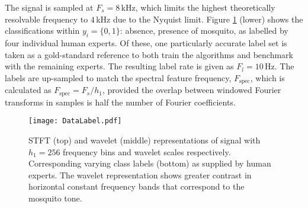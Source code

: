 \documentclass[10pt, twocolumn]{llncs}
\newcommand{\ikn}[1]{\todo[color=orange!30]{[ik] #1}}
\begin{document}
The signal is sampled at $F_s = 8 $\,kHz, which limits the highest theoretically resolvable frequency to $4$\,kHz due to the Nyquist limit. Figure \ref{fig:DataLabel} (lower) shows the classifications within $y_i = \{0,1\}$: absence, presence of mosquito, as labelled by four individual human experts. Of these, one particularly accurate label set is taken as a gold-standard reference to both train the algorithms and benchmark with the remaining experts. The resulting label rate is given as $F_l = 10$\,Hz. The labels are up-sampled to match the spectral feature frequency, $F_\textrm{spec}$, which is calculated as $F_\textrm{spec} = F_s /h_1 $, provided the overlap between windowed Fourier transforms in samples is half the number of Fourier coefficients.



\begin{figure}[t]
\centering
\texttt{[image: DataLabel.pdf]}
\caption{STFT (top) and wavelet (middle) representations of signal with $h_1 = 256$ frequency bins and wavelet scales respectively. Corresponding varying class labels (bottom) as supplied by human experts. The wavelet representation shows greater contrast in horizontal constant frequency bands that correspond to the mosquito tone.}
\label{fig:DataLabel}
\end{figure}
\end{document}
